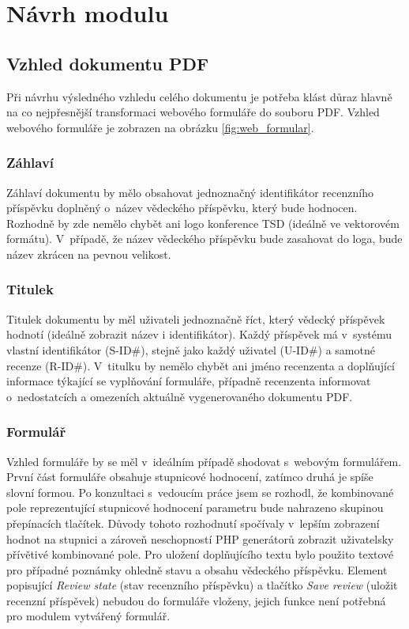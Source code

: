 \chapter{Návrh modulu}

\section{Vzhled dokumentu PDF}
\label{sec:navrh_vzhledu}
Při návrhu výsledného vzhledu celého dokumentu je potřeba klást důraz hlavně na co nejpřesnější transformaci webového formuláře do souboru PDF. Vzhled webového formuláře je zobrazen na obrázku \ref{fig:web_formular}.

\subsection{Záhlaví}
Záhlaví dokumentu by mělo obsahovat jednoznačný identifikátor recenzního příspěvku doplněný o~název vědeckého příspěvku, který bude hodnocen. Rozhodně by zde nemělo chybět ani logo konference TSD (ideálně ve vektorovém formátu). V~případě, že název vědeckého příspěvku bude zasahovat do loga, bude název zkrácen na pevnou velikost.

\subsection{Titulek}
Titulek dokumentu by měl uživateli jednoznačně říct, který vědecký příspěvek hodnotí (ideálně zobrazit název i identifikátor). Každý příspěvek má v~systému vlastní identifikátor (S-ID\#), stejně jako každý uživatel (U-ID\#) a samotné recenze (R-ID\#). V~titulku by nemělo chybět ani jméno recenzenta a doplňující informace týkající se vyplňování formuláře, případně recenzenta informovat o~nedostatcích a omezeních aktuálně vygenerovaného dokumentu PDF.

\subsection{Formulář}
Vzhled formuláře by se měl v~ideálním případě shodovat s~webovým formulářem. První část formuláře obsahuje stupnicové hodnocení, zatímco druhá je spíše slovní formou. Po konzultaci s~vedoucím práce jsem se rozhodl, že kombinované pole reprezentující stupnicové hodnocení parametru bude nahrazeno skupinou přepínacích tlačítek. Důvody tohoto rozhodnutí spočívaly v~lepším zobrazení hodnot na stupnici a zároveň neschopností PHP generátorů zobrazit uživatelsky přívětivé kombinované pole. Pro uložení doplňujícího textu bylo použito textové pro případné poznámky ohledně stavu a obsahu vědeckého příspěvku. Element popisující \textit{Review state} (stav recenzního příspěvku) a tlačítko \textit{Save review} (uložit recenzní příspěvek) nebudou do formuláře vloženy, jejich funkce není potřebná pro modulem vytvářený formulář.

